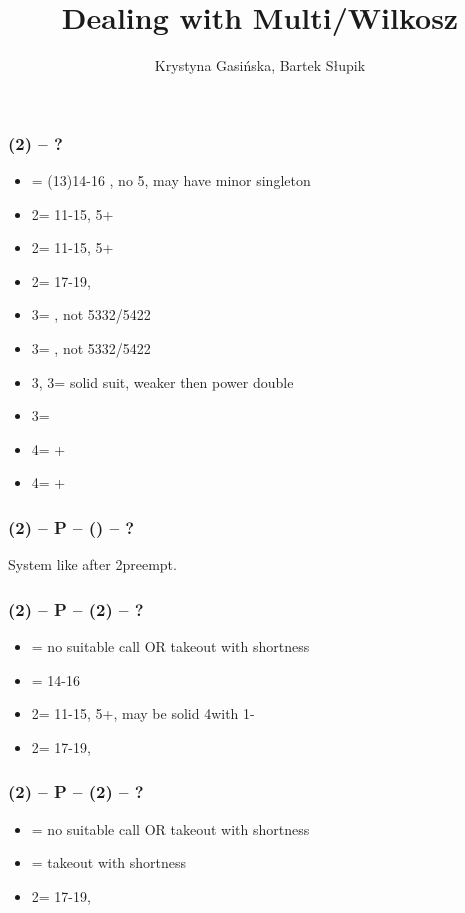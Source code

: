\documentclass[12pt, a4paper]{article}
\title{Dealing with Multi/Wilkosz}
\author{Krystyna Gasińska, Bartek Słupik}
\begin{document}
\maketitle


\subsubsection*{(2\diams) -- ?}
\begin{itemize}
    \item \dbl = (13)14-16 \bal, no 5\major, may have minor singleton \vimp
    \item 2\hearts = 11-15, 5+\hearts
    \item 2\spades = 11-15, 5+\spades
    \item 2\nt = 17-19, \bal
    \item 3\clubs = \clubs, not 5332/5422
    \item 3\diams = \diams, not 5332/5422
    \item 3\hearts, 3\spades = solid suit, weaker then power double
    \item 3\nt = \minor \vimp
    \item 4\clubs = \clubs+\major
    \item 4\diams = \diams+\major
\end{itemize}

\subsubsection*{(2\diams) -- P -- () -- ?}
System like after 2\diams preempt.

\subsubsection*{(2\diams) -- P -- (2\hearts) -- ?}
\begin{itemize}
    \item \pass = no suitable call OR takeout with \spades shortness
    \item \dbl = 14-16 \bal \vimp
    \item 2\spades = 11-15, 5+\spades, may be solid 4\spades with 1-\hearts
    \item 2\nt = 17-19, \bal
\end{itemize}

\subsubsection*{(2\diams) -- P -- (2\spades) -- ?}
\begin{itemize}
    \item \pass = no suitable call OR takeout with \hearts shortness \imp
    \item \dbl = takeout with \spades shortness \imp
    \item 2\nt = 17-19, \bal
\end{itemize}
\end{document}
